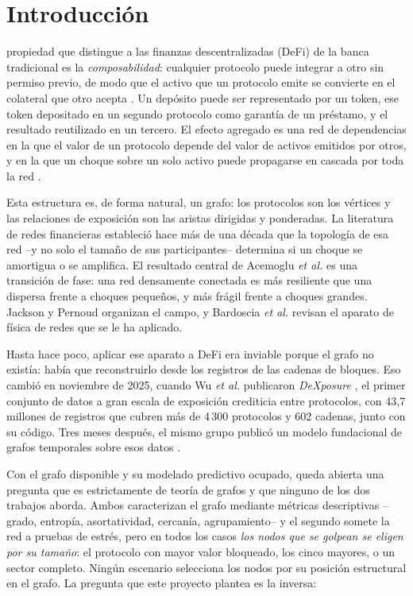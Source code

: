 \documentclass[journal]{IEEEtran}
\begin{document}
\section{Introducción}

 propiedad que distingue a las finanzas descentralizadas
(DeFi) de la banca tradicional es la \emph{composabilidad}: cualquier protocolo
puede integrar a otro sin permiso previo, de modo que el activo que un protocolo
emite se convierte en el colateral que otro acepta \cite{capponi2023defi}. Un
depósito puede ser representado por un token, ese token depositado en un segundo
protocolo como garantía de un préstamo, y el resultado reutilizado en un tercero.
El efecto agregado es una red de dependencias en la que el valor de un protocolo
depende del valor de activos emitidos por otros, y en la que un choque sobre un
solo activo puede propagarse en cascada por toda la red \cite{shu2026dexposurefm}.

Esta estructura es, de forma natural, un grafo: los protocolos son los vértices y
las relaciones de exposición son las aristas dirigidas y ponderadas. La literatura
de redes financieras estableció hace más de una década que la topología de esa red
--y no solo el tamaño de sus participantes-- determina si un choque se amortigua o
se amplifica. El resultado central de Acemoglu \emph{et al.}
\cite{acemoglu2015systemic} es una transición de fase: una red densamente conectada
es más resiliente que una dispersa frente a choques pequeños, y más frágil frente a
choques grandes. Jackson y Pernoud \cite{jackson2020survey} organizan el campo, y
Bardoscia \emph{et al.} \cite{bardoscia2021physics} revisan el aparato de física de
redes que se le ha aplicado.

Hasta hace poco, aplicar ese aparato a DeFi era inviable porque el grafo no
existía: había que reconstruirlo desde los registros de las cadenas de bloques.
Eso cambió en noviembre de 2025, cuando Wu \emph{et al.} publicaron
\emph{DeXposure} \cite{wu2025dexposure}, el primer conjunto de datos a gran escala
de exposición crediticia entre protocolos, con 43{,}7 millones de registros que
cubren más de 4\,300 protocolos y 602 cadenas, junto con su código. Tres meses
después, el mismo grupo publicó un modelo fundacional de grafos temporales sobre
esos datos \cite{shu2026dexposurefm}.

Con el grafo disponible y su modelado predictivo ocupado, queda abierta una
pregunta que es estrictamente de teoría de grafos y que ninguno de los dos
trabajos aborda. Ambos caracterizan el grafo mediante métricas descriptivas
--grado, entropía, asortatividad, cercanía, agrupamiento-- y el segundo somete la
red a pruebas de estrés, pero en todos los casos \emph{los nodos que se golpean se
eligen por su tamaño}: el protocolo con mayor valor bloqueado, los cinco mayores,
o un sector completo. Ningún escenario selecciona los nodos por su posición
estructural en el grafo. La pregunta que este proyecto plantea es la inversa:
\end{document}
